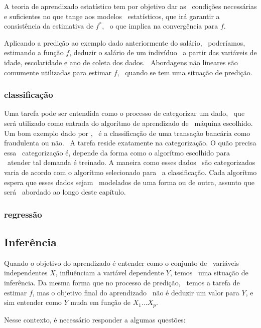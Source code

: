 A teoria de aprendizado estatístico tem por objetivo dar as \
condições necessárias e suficientes no que tange aos modelos \
estatísticos, que irá garantir a consistência da estimativa de $f^*$, \
o que implica na convergência para $f$\cite{Malhotra}.

Aplicando a predição ao exemplo dado anteriormente do salário, \
poderíamos, estimando a função $f$, deduzir o salário de um indivíduo \
a partir das variáveis de idade, escolaridade e ano de coleta dos dados. \
Abordagens não lineares são comumente utilizadas para estimar $f$, \
quando se tem uma situação de predição.

\subsubsection{classificação}

Uma tarefa pode ser entendida como o processo de categorizar um dado, \
que será utilizado como entrada do algorítmo de aprendizado de \
máquina escolhido. Um bom exemplo dado por \cite{Jordan}, \
é a classificação de uma transação bancária como fraudulenta ou não. \
A tarefa reside exatamente na categorização. O quão precisa essa \
categorização é, depende da forma como o algorítmo escolhido para \
atender tal demanda é treinado. A maneira como esses dados \
são categorizados varia de acordo com o algorítmo selecionado para \
a classificação. Cada algorítmo espera que esses dados sejam \
modelados de uma forma ou de outra, assunto que será \
abordado ao longo deste capítulo.

\subsubsection{regressão}


\subsection{Inferência}

Quando o objetivo do aprendizado é entender como o conjunto de \
variáveis independentes $X$, influênciam a variável dependente $Y$, temos \
uma situação de inferência. Da mesma forma que no processo de predição, \
temos a tarefa de estimar $f$, mas o objetivo final do aprendizado \
não é deduzir um valor para $Y$, e sim entender como $Y$ muda em função de $X_1...X_p$.

Nesse contexto, é necessário responder a algumas questões:

